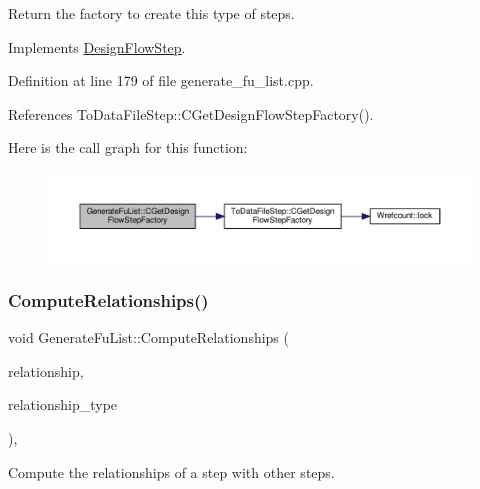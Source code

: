 Return the factory to create this type of steps. 



Implements \hyperlink{classDesignFlowStep_a5510a8d296670a07f6b53312c448994c}{Design\+Flow\+Step}.



Definition at line 179 of file generate\+\_\+fu\+\_\+list.\+cpp.



References To\+Data\+File\+Step\+::\+C\+Get\+Design\+Flow\+Step\+Factory().

Here is the call graph for this function\+:
\nopagebreak
\begin{figure}[H]
\begin{center}
\leavevmode
\includegraphics[width=350pt]{db/dea/classGenerateFuList_a51c1a9b6fe9a61328d6dc99d8e0bd47c_cgraph}
\end{center}
\end{figure}
\mbox{\label{classGenerateFuList_a3651813235effdc39f39dd064571a135}} 
\subsubsection{\texorpdfstring{Compute\+Relationships()}{ComputeRelationships()}}
{\footnotesize\ttfamily void Generate\+Fu\+List\+::\+Compute\+Relationships (\begin{DoxyParamCaption}\item[{\hyperlink{classDesignFlowStepSet}{Design\+Flow\+Step\+Set} \&}]{relationship,  }\item[{const \hyperlink{classDesignFlowStep_a723a3baf19ff2ceb77bc13e099d0b1b7}{Design\+Flow\+Step\+::\+Relationship\+Type}}]{relationship\+\_\+type }\end{DoxyParamCaption})\hspace{0.3cm}{\ttfamily [override]}, {\ttfamily [virtual]}}



Compute the relationships of a step with other steps. 


